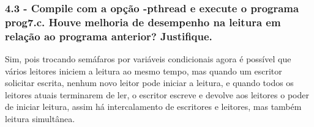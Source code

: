\subsubsection{4.3 - Compile com a opção -pthread e execute o programa prog7.c. Houve melhoria de desempenho na leitura em relação ao programa anterior? Justiﬁque.}

Sim, pois trocando semáfaros por variáveis condicionais agora é possível que vários leitores iniciem a leitura ao mesmo tempo, mas quando um escritor solicitar escrita, nenhum novo leitor pode iniciar a leitura, e quando todos os leitores atuais terminarem de ler, o escritor escreve e devolve aos leitores o poder de iniciar leitura, assim há intercalamento de escritores e leitores, mas também leitura simultânea.

